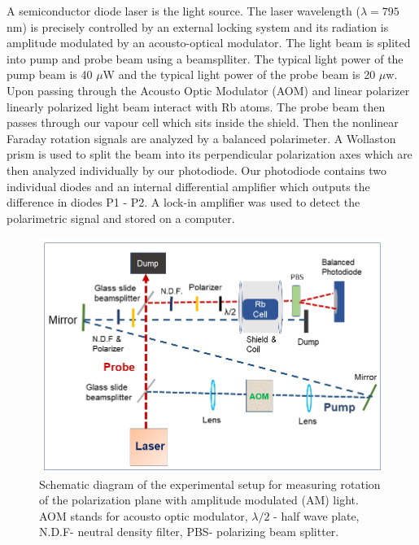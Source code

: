 A semiconductor diode laser is the light source. The laser
wavelength ($\lambda=795$ nm) is precisely controlled by an external
locking system and its radiation is amplitude modulated by an
acousto-optical modulator.  The light beam is splited into pump and
probe beam using a beamsplliter. The typical light power of the pump
beam is 40 $\mu$W and the typical light power of the probe beam is 20
$\mu$w. Upon passing through the Acousto Optic Modulator (AOM) and
linear polarizer linearly polarized light beam interact with Rb
atoms. The probe beam then passes through our vapour cell which sits
inside the shield. Then the nonlinear Faraday rotation signals are
analyzed by a balanced polarimeter.  A Wollaston prism is used to
split the beam into its perpendicular polarization axes which are then
analyzed individually by our photodiode. Our photodiode contains two
individual diodes and an internal differential amplifier which outputs
the difference in diodes P1 - P2. A lock-in amplifier was used to
detect the polarimetric signal and stored on a computer.
\begin{figure}%
\centering
\includegraphics[width=0.95\linewidth]{figures/experimental_setup}
\caption{Schematic diagram of the experimental setup for measuring
  rotation of the polarization plane with amplitude modulated (AM)
  light. AOM stands for acousto optic modulator, $\lambda/2$ - half
  wave plate, N.D.F- neutral density filter, PBS- polarizing beam
  splitter.\label{fig:pumpprobe}}
\end{figure}
